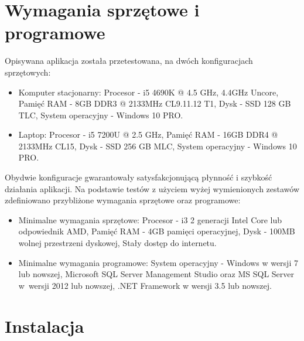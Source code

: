 \documentclass[a4paper]{book}
\begin{document}
\section{Wymagania sprzętowe i programowe}
Opisywana aplikacja została przetestowana, na dwóch konfiguracjach sprzętowych:
 \begin{itemize}
	\item Komputer stacjonarny:
	\subitem Procesor - i5 4690K @ 4.5 GHz, 4.4GHz Uncore,
	\subitem Pamięć RAM - 8GB DDR3 @ 2133MHz CL9.11.12 T1,
	\subitem Dysk - SSD 128 GB TLC,
	\subitem System operacyjny - Windows 10 PRO.
	\item Laptop:
	\subitem Procesor - i5 7200U @ 2.5 GHz,
	\subitem Pamięć RAM - 16GB DDR4 @ 2133MHz CL15,
	\subitem Dysk - SSD 256 GB MLC,
	\subitem System operacyjny - Windows 10 PRO.
\end{itemize}
Obydwie konfiguracje gwarantowały satysfakcjonującą płynność i szybkość działania aplikacji.
Na podstawie testów z użyciem wyżej wymienionych zestawów zdefiniowano przybliżone wymagania sprzętowe oraz programowe:
\begin{itemize}
	\item Minimalne wymagania sprzętowe:
	\subitem Procesor - i3 2 generacji Intel Core lub odpowiednik AMD,
	\subitem Pamięć RAM - 4GB pamięci operacyjnej,
	\subitem Dysk - 100MB wolnej przestrzeni dyskowej,
	\subitem Stały dostęp do internetu.
	\item Minimalne wymagania programowe:
	\subitem System operacyjny - Windows w wersji 7 lub nowszej,
	\subitem Microsoft SQL Server Management Studio oraz MS SQL Server w~wersji 2012 lub nowszej,
	\subitem .NET Framework w wersji 3.5 lub nowszej.
\end{itemize}
\section{Instalacja}
\end{document}
